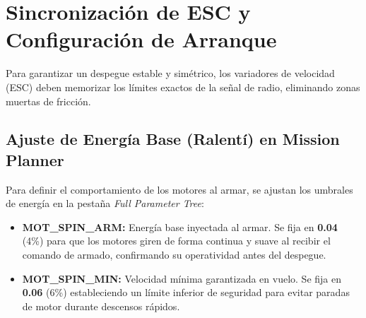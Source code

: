 \documentclass[12pt,a4paper]{article}
\begin{document}
\section{Sincronización de ESC y Configuración de Arranque}
Para garantizar un despegue estable y simétrico, los variadores de velocidad (ESC) deben memorizar los límites exactos de la señal de radio, eliminando zonas muertas de fricción.

\subsection{Ajuste de Energía Base (Ralentí) en Mission Planner}
Para definir el comportamiento de los motores al armar, se ajustan los umbrales de energía en la pestaña \textit{Full Parameter Tree}:
\begin{itemize}[leftmargin=*]
    \item \textbf{MOT\_SPIN\_ARM:} Energía base inyectada al armar. Se fija en \textbf{0.04} (4\%) para que los motores giren de forma continua y suave al recibir el comando de armado, confirmando su operatividad antes del despegue.
    \item \textbf{MOT\_SPIN\_MIN:} Velocidad mínima garantizada en vuelo. Se fija en \textbf{0.06} (6\%) estableciendo un límite inferior de seguridad para evitar paradas de motor durante descensos rápidos.
\end{itemize}
\end{document}
